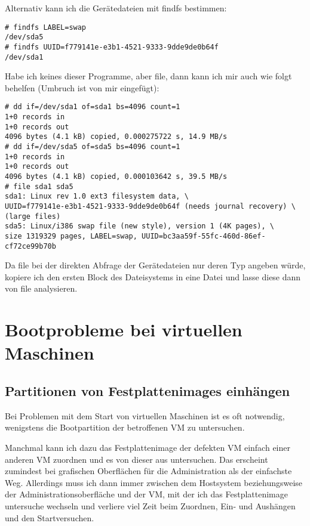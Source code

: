 Alternativ kann ich die Gerätedateien mit findfs bestimmen:
\begin{verbatim}
# findfs LABEL=swap
/dev/sda5
# findfs UUID=f779141e-e3b1-4521-9333-9dde9de0b64f
/dev/sda1
\end{verbatim}

Habe ich keines dieser Programme, aber file, dann kann ich mir auch wie folgt
behelfen (Umbruch ist von mir eingefügt):
\begin{verbatim}
# dd if=/dev/sda1 of=sda1 bs=4096 count=1
1+0 records in
1+0 records out
4096 bytes (4.1 kB) copied, 0.000275722 s, 14.9 MB/s
# dd if=/dev/sda5 of=sda5 bs=4096 count=1
1+0 records in
1+0 records out
4096 bytes (4.1 kB) copied, 0.000103642 s, 39.5 MB/s
# file sda1 sda5
sda1: Linux rev 1.0 ext3 filesystem data, \
UUID=f779141e-e3b1-4521-9333-9dde9de0b64f (needs journal recovery) \
(large files)
sda5: Linux/i386 swap file (new style), version 1 (4K pages), \
size 1319329 pages, LABEL=swap, UUID=bc3aa59f-55fc-460d-86ef-cf72ce99b70b
\end{verbatim}

Da file bei der direkten Abfrage der Gerätedateien nur deren Typ angeben
würde, kopiere ich den ersten Block des Dateisystems in eine Datei und lasse
diese dann von file analysieren.

\section{Bootprobleme bei virtuellen Maschinen}
\label{sec:lokal-bootprobleme-vm}

\subsection*{Partitionen von Festplattenimages einhängen}
\label{sec:mount-hdimage-partition}

Bei Problemen mit dem Start von virtuellen Maschinen ist es oft notwendig,
wenigstens die Bootpartition der betroffenen VM zu untersuchen.

Manchmal kann
ich dazu das Festplattenimage der defekten VM einfach einer anderen VM
zuordnen und es von dieser aus untersuchen. Das erscheint zumindest bei
grafischen Oberflächen für die Administration als der einfachste Weg.
Allerdings muss ich dann immer zwischen dem Hostsystem beziehungsweise der
Administrationsoberfläche und der VM, mit der ich das Festplattenimage
untersuche wechseln und verliere viel Zeit beim Zuordnen, Ein- und Aushängen
und den Startversuchen.


